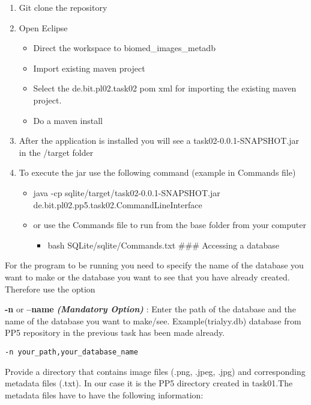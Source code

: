 \begin{enumerate}
\def\labelenumi{\arabic{enumi}.}
\tightlist
\item
  Git clone the repository
\item
  Open Eclipse

  \begin{itemize}
  \tightlist
  \item
    Direct the workspace to biomed\_images\_metadb
  \item
    Import existing maven project
  \item
    Select the de.bit.pl02.task02 pom xml for importing the existing
    maven project.
  \item
    Do a maven install
  \end{itemize}
\item
  After the application is installed you will see a
  task02-0.0.1-SNAPSHOT.jar in the /target folder
\item
  To execute the jar use the following command (example in Commands
  file)

  \begin{itemize}
  \tightlist
  \item
    java -cp sqlite/target/task02-0.0.1-SNAPSHOT.jar
    de.bit.pl02.pp5.task02.CommandLineInterface 
  \item
    or use the Commands file to run from the base folder from your
    computer

    \begin{itemize}
    \tightlist
    \item
      bash SQLite/sqlite/Commands.txt \#\#\# Accessing a database
    \end{itemize}
  \end{itemize}
\end{enumerate}

For the program to be running you need to specify the name of the
database you want to make or the database you want to see that you have
already created. Therefore use the option

\textbf{-n} or \textbf{--name} \textbf{\emph{(Mandatory Option)}} :
Enter the path of the database and the name of the database you want to
make/see. Example(trialyy.db) database from PP5 repository in the
previous task has been made already.

\begin{verbatim}
-n your_path,your_database_name 
\end{verbatim}

Provide a directory that contains image files (.png, .jpeg, .jpg) and
corresponding metadata files (.txt). In our case it is the PP5 directory
created in task01.The metadata files have to have the following
information:

